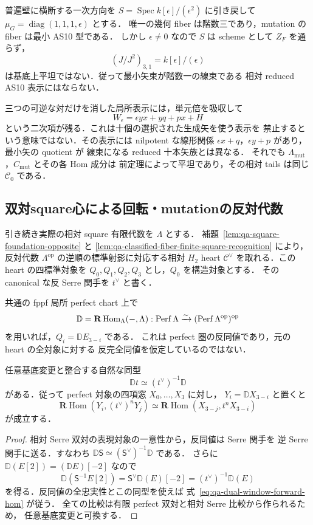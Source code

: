 \begin{example}
普遍壁に横断する一次方向を
$S=\operatorname{Spec}k[\epsilon]/(\epsilon^2)$ に引き戻して
$\mu_G=\operatorname{diag}(1,1,1,\epsilon)$ とする．
唯一の幾何 fiber は階数三であり，mutation の fiber は最小 AS10 型である．
しかし $\epsilon\ne0$ なので $S$ は scheme として $Z_F$ を通らず，
\[
 (J/J^2)_{3,1}=k[\epsilon]/(\epsilon)
\]
は基底上平坦ではない．従って最小矢束が階数一の線束である
相対 reduced AS10 表示にはならない．

三つの可逆な対だけを消した局所表示には，単元倍を吸収して
\[
 W_\epsilon=\epsilon yx+yq+px+H
\]
という二次項が残る．これは十個の選択された生成矢を使う表示を
禁止するという意味ではない．その表示には nilpotent な線形関係
$\epsilon x+q$，$\epsilon y+p$ があり，最小矢の quotient が
線束になる reduced 十本矢族とは異なる．
それでも $\Lambda_{\mathrm{mut}}$，$C_{\mathrm{mut}}$ とその各 Hom 成分は
前定理によって平坦であり，その相対 tails は同じ $\mathcal C_0$ である．
\end{example}

\subsection{双対square心による回転・mutationの反対代数}
\label{subsec:qa-relative-rot-mut-opposite-heart}

引き続き実際の相対 square 有限代数を $\Lambda$ とする．
補題~\ref{lem:qa-square-foundation-opposite} と
\ref{lem:qa-classified-fiber-finite-square-recognition} により，
反対代数 $\Lambda^{\mathrm{op}}$ の逆順の標準射影に対応する相対 $H_2$ heart
$\mathcal C^\vee$ を取れる．この heart の四標準対象を
$Q_0,Q_1,Q_2,Q_3$ とし，$Q_0$ を構造対象とする．
その canonical な反 Serre 関手を $t^\vee$ と書く．

共通の fppf 局所 perfect chart 上で
\[
 \mathbb D=\mathbf R\operatorname{Hom}_\Lambda(-,\Lambda):
       \operatorname{Perf}\Lambda\xrightarrow{\sim}(\operatorname{Perf}\Lambda^{\mathrm{op}})^{\mathrm{op}}
\]
を用いれば，$Q_i=\mathbb D E_{3-i}$ である．
これは perfect 圏の反同値であり，元の heart の全対象に対する
反完全同値を仮定しているのではない．

\begin{lemma}[反同値とcanonical周期]
\label{lem:qa-relative-dual-reverses-antiserre}
任意基底変更と整合する自然な同型
\[
 \mathbb D t\simeq(t^\vee)^{-1}\mathbb D
\]
がある．従って perfect 対象の四項窓 $X_0,\ldots,X_3$ に対し，
$Y_i=\mathbb D X_{3-i}$ と置くと
\[
 \mathbf R\operatorname{Hom}(Y_i,(t^\vee)^nY_j)
 \simeq
 \mathbf R\operatorname{Hom}(X_{3-j},t^nX_{3-i})
 \tag{DF}\label{eq:qa-dual-window-forward-hom}
\]
が成立する．
\end{lemma}
\begin{proof}
相対 Serre 双対の表現対象の一意性から，反同値は Serre 関手を
逆 Serre 関手に送る．すなわち
$\mathbb D\mathsf S\simeq(\mathsf S^\vee)^{-1}\mathbb D$ である．
さらに $\mathbb D(E[2])=(\mathbb D E)[-2]$ なので
\[
 \mathbb D(\mathsf S^{-1}E[2])
     =\mathsf S^\vee\mathbb D(E)[-2]
     =(t^\vee)^{-1}\mathbb D(E)
\]
を得る．反同値の全忠実性とこの同型を使えば
式~\eqref{eq:qa-dual-window-forward-hom} が従う．
全ての比較は有限 perfect 双対と相対 Serre 比較から作られるため，
任意基底変更と可換する．
\end{proof}

